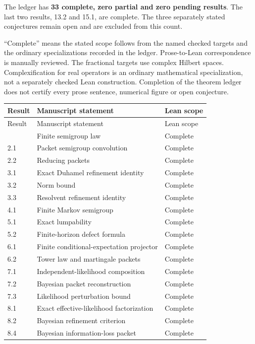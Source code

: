 \documentclass[11pt,letterpaper]{article}
\theoremstyle{plain}
\theoremstyle{plain}
\theoremstyle{plain}
\theoremstyle{definition}
\theoremstyle{definition}
\theoremstyle{definition}
\theoremstyle{definition}
\theoremstyle{definition}
\theoremstyle{remark}
\theoremstyle{remark}
\theoremstyle{remark}
\theoremstyle{remark}
\theoremstyle{remark}
\theoremstyle{remark}
\begin{document}
The ledger has \textbf{33 complete, zero partial and zero pending results}.
The last two results, 13.2 and 15.1, are complete. The three separately stated
conjectures remain open and are excluded from this count.

``Complete'' means the stated scope follows from the named checked targets
and the ordinary specializations recorded in the ledger. Prose-to-Lean correspondence
is manually reviewed. The fractional targets use complex Hilbert spaces.
Complexification for real operators is an ordinary mathematical specialization,
not a separately checked Lean construction. Completion of the theorem ledger does
not certify every prose sentence, numerical figure or open conjecture.

\small
\begin{longtable}{@{}p{}p{}p{}@{}}
\toprule Result & Manuscript statement & Lean scope\\
\midrule\endfirsthead
\toprule Result & Manuscript statement & Lean scope\\\midrule\endhead
\bottomrule\endfoot
1.2 & Finite semigroup law & Complete\\
2.1 & Packet semigroup convolution & Complete\\
2.2 & Reducing packets & Complete\\
3.1 & Exact Duhamel refinement identity & Complete\\
3.2 & Norm bound & Complete\\
3.3 & Resolvent refinement identity & Complete\\
4.1 & Finite Markov semigroup & Complete\\
5.1 & Exact lumpability & Complete\\
5.2 & Finite-horizon defect formula & Complete\\
6.1 & Finite conditional-expectation projector & Complete\\
6.2 & Tower law and martingale packets & Complete\\
7.1 & Independent-likelihood composition & Complete\\
7.2 & Bayesian packet reconstruction & Complete\\
7.3 & Likelihood perturbation bound & Complete\\
8.1 & Exact effective-likelihood factorization & Complete\\
8.2 & Bayesian refinement criterion & Complete\\
8.4 & Bayesian information-loss packet & Complete\\

\end{longtable}
\end{document}
